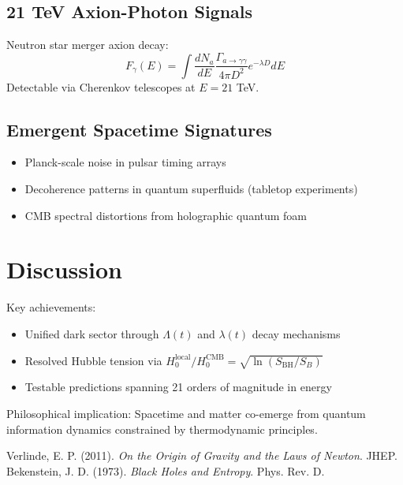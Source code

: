 \documentclass[12pt,a4paper]{article}
\begin{document}
\subsection{21 TeV Axion-Photon Signals}
Neutron star merger axion decay:
\[
F_\gamma(E) = \int \frac{dN_a}{dE} \frac{\Gamma_{a\to\gamma\gamma}}{4\pi D^2} e^{-\lambda D} dE
\]
Detectable via Cherenkov telescopes at $E = 21$ TeV.

\subsection{Emergent Spacetime Signatures}
\begin{itemize}
\item Planck-scale noise in pulsar timing arrays
\item Decoherence patterns in quantum superfluids (tabletop experiments)
\item CMB spectral distortions from holographic quantum foam
\end{itemize}

\section{Discussion}
Key achievements:
\begin{itemize}
\item Unified dark sector through $\Lambda(t)$ and $\lambda(t)$ decay mechanisms
\item Resolved Hubble tension via $H_0^{\text{local}}/H_0^{\text{CMB}} = \sqrt{\ln(S_{\text{BH}}/S_B)}$
\item Testable predictions spanning 21 orders of magnitude in energy
\end{itemize}

Philosophical implication: Spacetime and matter co-emerge from quantum information dynamics constrained by thermodynamic principles.

\begin{thebibliography}{9}
 Verlinde, E. P. (2011). \textit{On the Origin of Gravity and the Laws of Newton}. JHEP.
 Bekenstein, J. D. (1973). \textit{Black Holes and Entropy}. Phys. Rev. D.
\end{thebibliography}
\end{document}
